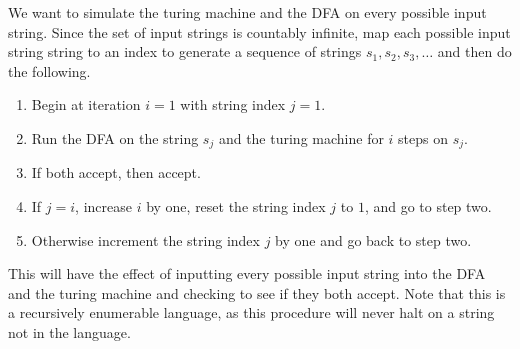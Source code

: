\documentclass[12pt]{article}
\begin{document}
We want to simulate the turing machine and the DFA on every possible input string. Since the set of input strings is
countably infinite, map each possible input string string to an index to generate a sequence of strings \(s_1, s_2, s_3,\ldots\) and
then do the following.
\begin{enumerate}
        \item Begin at iteration \(i=1\) with string index \(j=1\).
        \item Run the DFA on the string \(s_j\) and the turing machine for \(i\) steps on \(s_j\).
        \item If both accept, then accept.
        \item If \(j=i\), increase \(i\) by one, reset the string index \(j\) to \(1\), and go to step two.
        \item Otherwise increment the string index \(j\) by one and go back to step two.
\end{enumerate}
This will have the effect of inputting every possible input string into the DFA and the turing machine and checking to see if they both accept.
Note that this is a recursively enumerable language, as this procedure will never halt on a string not in the language.
\end{document}
